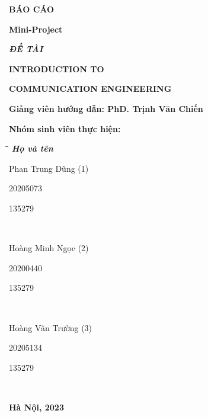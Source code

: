 \documentclass[a4paper]{article}
\begin{document}
\begin{titlepage}
\begin{center}
        \vspace{30pt}
        \fontsize{18pt}{17pt}\selectfont
        \textbf{BÁO CÁO}

        \vspace{7pt}
        \textbf{ Mini-Project}
    \end{center}
    \begin{flushleft}
        \fontsize{14pt}{17pt}\selectfont
        \textbf{\textsl{ĐỀ TÀI}}
        \vspace{7pt}
    \end{flushleft}
    \begin{center}
        \fontsize{18pt}{17pt}\selectfont
        \textbf{INTRODUCTION TO }

        \vspace{7pt}
        \textbf{COMMUNICATION ENGINEERING}
    \end{center}

    \vspace{15pt}
    \textbf{Giảng viên hướng dẫn: PhD. Trịnh Văn Chiến}

    \vspace{10pt}
    \textbf{Nhóm sinh viên thực hiện:}

    \begin{tabbing}
        \hspace{8cm}\=\hspace{3cm}\=\hspace{3cm} \kill
        {\it \textbf{Họ và tên}}\\
         \begin{bfseries}Phan Trung Dũng (1)\end{bfseries}\> \begin{bfseries}20205073\end{bfseries}\> \begin{bfseries}135279\end{bfseries}\\
        \begin{bfseries}Hoàng Minh Ngọc (2)\end{bfseries}\> \begin{bfseries}20200440\end{bfseries}\> \begin{bfseries}135279\end{bfseries}\\
        \begin{bfseries}Hoàng Vân Trường (3)\end{bfseries}\> \begin{bfseries}20205134\end{bfseries}\> \begin{bfseries}135279\end{bfseries}\\
    \end{tabbing}
    \vspace{10pt}
    \begin{center}
        \textbf{Hà Nội, 2023}
    \end{center}
\end{titlepage}
\end{document}
